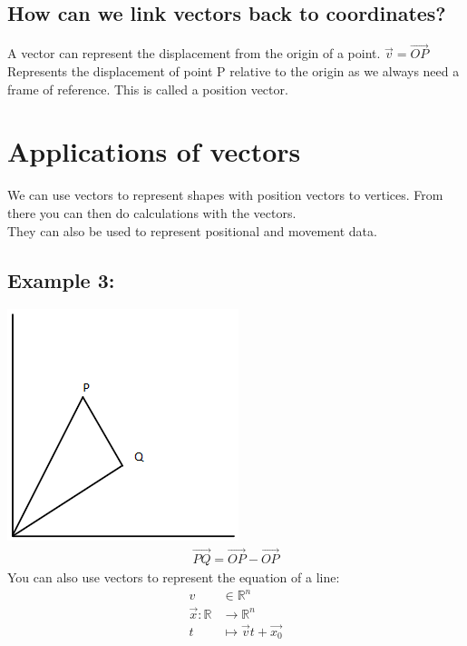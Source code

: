 \documentclass[a4paper,12pt]{article}
\begin{document}
\subsection*{How can we link vectors back to coordinates?}
A vector can represent the displacement from the origin of a point.
$ \vec{v} = \overrightarrow{OP} $ Represents the displacement of point P relative to the origin as we always need a frame of reference. This is called a position vector.
\section*{Applications of vectors}
We can use vectors to represent shapes with position vectors to vertices. From there you can then do calculations with the vectors.\\
They can also be used to represent positional and movement data. 
\subsection*{Example 3:}
\includegraphics[scale=0.5]{fig2} \\
\begin{align*}
\overrightarrow{PQ} = \overrightarrow{OP} - \overrightarrow{OP}
\end{align*}
You can also use vectors to represent the equation of a line:
\begin{align*}
v & \in \mathbb{R}^n \\
\vec{x}: \mathbb{R} & \rightarrow \mathbb{R}^n \\
t & \mapsto \vec{v}t + \vec{x_0} \\
\end{align*}
\end{document}
